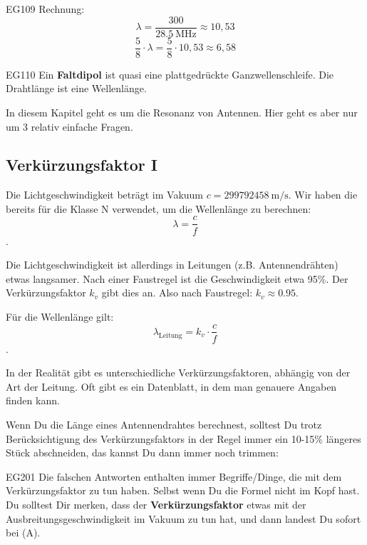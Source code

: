 \begin{sol}{EG109}
    Rechnung: 
    $$\lambda = \frac{300}{\SI{28,5}{\mega\hertz}} \approx 10,53$$
    $$\frac{5}{8}\cdot \lambda = \frac{5}{8} \cdot 10,53 \approx  6,58$$
\end{sol}

\begin{sol}{EG110}
  Ein \textbf{Faltdipol} ist quasi eine plattgedrückte Ganzwellenschleife. Die Drahtlänge ist eine Wellenlänge.
\end{sol}


\begin{ohmchapter}
In diesem Kapitel geht es um die Resonanz von Antennen. Hier geht es aber nur um 3 relativ einfache Fragen.
\end{ohmchapter}


\subsection{Verkürzungsfaktor I}

Die Lichtgeschwindigkeit beträgt im Vakuum $c= \SI{299792458} {\meter/\second}$. Wir haben die bereits für die Klasse N verwendet, um die Wellenlänge zu berechnen:
$$ \lambda = \frac{c}{f}$$.

Die Lichtgeschwindigkeit ist allerdings in Leitungen (z.B. Antennendrähten) etwas langsamer. Nach einer Faustregel ist die Geschwindigkeit etwa 95\%. Der Verkürzungsfaktor $k_v$ gibt dies an. Also nach Faustregel: $k_v  \approx 0.95$.

Für die Wellenlänge gilt:
$$ \lambda_{\text{Leitung}} = k_v \cdot \frac{c}{f}$$.

In der Realität gibt es unterschiedliche Verkürzungsfaktoren, abhängig von der Art der Leitung. Oft gibt es ein Datenblatt, in dem man genauere Angaben finden kann.

Wenn Du die Länge eines Antennendrahtes berechnest, solltest Du trotz Berücksichtigung des Verkürzungsfaktors in der Regel immer ein 10-15\% längeres Stück abschneiden, das kannst Du dann immer noch trimmen:


\begin{sol}{EG201}
Die falschen Antworten enthalten immer Begriffe/Dinge, die mit dem Verkürzungsfaktor zu tun haben. Selbst wenn Du die Formel nicht im Kopf hast. Du solltest Dir merken, dass der \textbf{Verkürzungsfaktor} etwas mit der Ausbreitungsgeschwindigkeit im Vakuum zu tun hat, und dann landest Du sofort bei (A).
\end{sol}

